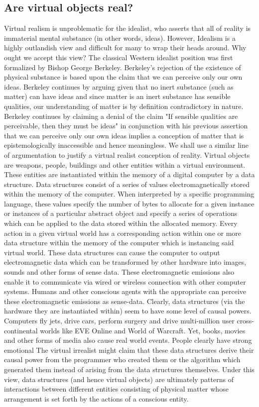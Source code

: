 \subsection{Are virtual objects real?}
Virtual realism is unproblematic for the idealist, who asserts that all of reality is immaterial mental substance (in other words, ideas). However, Idealism is a highly outlandish view and difficult for many to wrap their heads around. Why ought we accept this view? The classical Western idealist position was first formalized by Bishop George Berkeley. Berkeley's rejection of the existence of physical substance is based upon the claim that we can perceive only our own ideas. Berkeley continues by arguing given that no inert substance (such as matter) can have ideas and since matter is an inert substance has sensible qualities, our understanding of matter is by definition contradictory in nature. Berkeley continues by claiming a denial of the claim "If sensible qualities are perceivable, then they must be ideas" in conjunction with his previous assertion that we can perceive only our own ideas implies a conception of matter that is epistemologically inaccessible and hence meaningless. \cite{berkeley2003a} We shall use a similar line of argumentation to justify a virtual realist conception of reality. Virtual objects are weapons, people, buildings and other entities within a virtual environment. These entities are instantiated within the memory of a digital computer by a data structure. Data structures consist of a series of values electromagnetically stored within the memory of the computer. When interpreted by a specific programming language, these values specify the number of bytes to allocate for a given instance or instances of a particular abstract object and specify a series of operations which can be applied to the data stored within the allocated memory. Every action in a given virtual world has a corresponding action within one or more data structure within the memory of the computer which is instancing said virtual world. These data structures can cause the computer to output electromagnetic data which can be transformed by other hardware into images, sounds and other forms of sense data. These electromagnetic emissions also enable it to communicate via wired or wireless connection with other computer systems. Humans and other conscious agents with the appropriate can perceive these electromagnetic emissions as sense-data. Clearly, data structures (via the hardware they are instantiated within) seem to have some level of causal powers. Computers fly jets, drive cars, perform surgery and drive multi-million user cross-continental worlds like EVE Online and World of Warcraft. Yet, books, movies and other forms of media also cause real world events. People clearly have strong emotional The virtual irrealist might claim that these data structures derive their causal power from the programmer who created them or the algorithm which generated them instead of arising from the data structures themselves. Under this view, data structures (and hence virtual objects) are ultimately patterns of interactions between different entities consisting of physical matter whose arrangement is set forth by the actions of a conscious entity. 